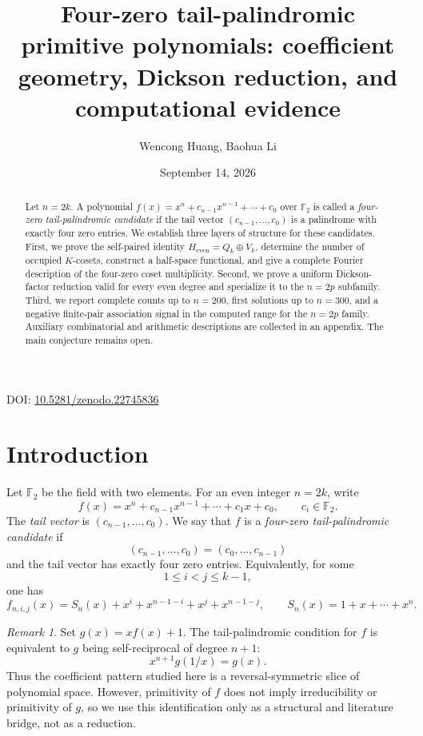 \documentclass[11pt]{article}
\title{Four-zero tail-palindromic primitive polynomials: coefficient geometry, Dickson reduction, and computational evidence}
\author{Wencong Huang, Baohua Li}
\date{September 14, 2026}
\theoremstyle{definition}
\theoremstyle{remark}
\newtheorem{remark}[theorem]{Remark}
\begin{document}
\maketitle

\begin{center}
\small DOI: \href{https://doi.org/10.5281/zenodo.22745836}{10.5281/zenodo.22745836}
\end{center}

\begin{abstract}
Let \(n=2k\). A polynomial \(f(x)=x^n+c_{n-1}x^{n-1}+\cdots+c_0\) over \(\mathbb F_2\) is called a \emph{four-zero tail-palindromic candidate} if the tail vector \((c_{n-1},\ldots,c_0)\) is a palindrome with exactly four zero entries. We establish three layers of structure for these candidates. First, we prove the self-paired identity \(H_{\mathrm{even}}=Q_k\oplus V_k\), determine the number of occupied \(K\)-cosets, construct a half-space functional, and give a complete Fourier description of the four-zero coset multiplicity. Second, we prove a uniform Dickson-factor reduction valid for every even degree and specialize it to the \(n=2p\) subfamily. Third, we report complete counts up to \(n=200\), first solutions up to \(n=300\), and a negative finite-pair association signal in the computed range for the \(n=2p\) family. Auxiliary combinatorial and arithmetic descriptions are collected in an appendix. The main conjecture remains open.
\end{abstract}

\section{Introduction}\label{sec:intro}

Let $\mathbb F_2$ be the field with two elements. For an even integer $n=2k$, write
\[
f(x)=x^n+c_{n-1}x^{n-1}+\cdots+c_1x+c_0,\qquad c_i\in\mathbb F_2.
\]
The \emph{tail vector} is $(c_{n-1},\ldots,c_0)$. We say that $f$ is a \emph{four-zero tail-palindromic candidate} if
\[
(c_{n-1},\ldots,c_0)=(c_0,\ldots,c_{n-1})
\]
and the tail vector has exactly four zero entries. Equivalently, for some
\[
1\le i<j\le k-1,
\]
one has
\begin{equation}\label{eq:candidate}
f_{n,i,j}(x)
=
S_n(x)+x^i+x^{n-1-i}+x^j+x^{n-1-j},
\qquad
S_n(x)=1+x+\cdots+x^n.
\end{equation}

\begin{remark}\label{rem:selfreciprocal}
Set \(g(x)=xf(x)+1\). The tail-palindromic condition for \(f\) is equivalent to \(g\) being self-reciprocal of degree \(n+1\):
\[
x^{n+1}g(1/x)=g(x).
\]
Thus the coefficient pattern studied here is a reversal-symmetric slice of polynomial space. However, primitivity of \(f\) does not imply irreducibility or primitivity of \(g\), so we use this identification only as a structural and literature bridge, not as a reduction.
\end{remark}
\end{document}
